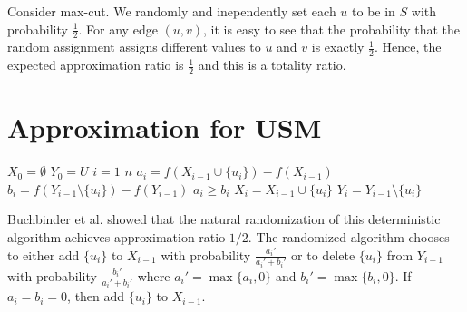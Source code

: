 Consider max-cut. We randomly and inependently set each $u$ to be in $S$ with probability $\frac{1}{2}$. For any edge $(u,v)$, it is easy to see that the probability that the random assignment assigns different values to $u$ and $v$ is exactly $\frac{1}{2}$. Hence, the expected approximation ratio is $\frac{1}{2}$ and this is a totality ratio.

\section{Approximation for USM}

\begin{codebox}
    \li $X_0 = \emptyset$ 
    \li $Y_0 = U$
    \li \For $i = 1$ \To $n$ \Do
        \li $a_i = f(X_{i-1} \cup \{u_i\}) - f(X_{i-1})$
        \li $b_i = f(Y_{i-1} \setminus \{u_i\}) - f(Y_{i-1})$
        \li \If $a_i \geq b_i$ \Then
            \li $X_i = X_{i-1} \cup \{u_i\}$
            \li $Y_i = Y_{i-1} \setminus \{u_i\}$
        \End
    \End
\end{codebox}

Buchbinder et al. showed that the natural randomization of this deterministic algorithm achieves approximation ratio $1/2$. The randomized algorithm chooses to either add $\{u_i\}$ to $X_{i-1}$ with probability $\frac{a_i'}{a_i'+b_i'}$ or to delete $\{u_i\}$ from $Y_{i-1}$ with probability $\frac{b_i'}{a_i' + b_i'}$ where $a_i' = \max\{a_i,0\}$ and $b_i' = \max\{b_i,0\}$. If $a_i = b_i = 0$, then add $\{u_i\}$ to $X_{i-1}$.

